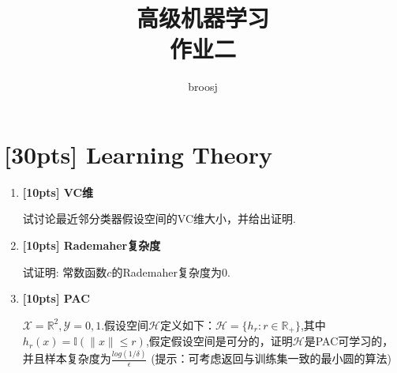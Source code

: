 \documentclass[a4paper,UTF8]{article}
\numberwithin{equation}{section}
\begin{document}
\graphicspath{{image/}}
\title{高级机器学习\\
作业二}
\author{broosj}
\maketitle

\section{[30pts] Learning Theory}
\begin{enumerate}[(1)]
	\item \textbf{[10pts] VC维} 

	试讨论最近邻分类器假设空间的VC维大小，并给出证明.
	\item \textbf{[10pts] Rademaher复杂度}
	
	试证明: 常数函数$c$的Rademaher复杂度为$0$.
	\item \textbf{[10pts] PAC} 
	
	$\mathcal{X}=\mathbb{R}^2, \mathcal{Y}= {0,1}.$假设空间$\mathcal{H}$定义如下：$\mathcal{H}=\{h_r:r \in \mathbb{R}_+\}$,其中$h_r (x)=\mathbb{I}(\parallel x \parallel \leq r)$,假定假设空间是可分的，证明$\mathcal{H}$是PAC可学习的，并且样本复杂度为$\frac{log(1/\delta)}{\epsilon}$
	\newline
	(提示：可考虑返回与训练集一致的最小圆的算法)
\end{enumerate}
\end{document}
